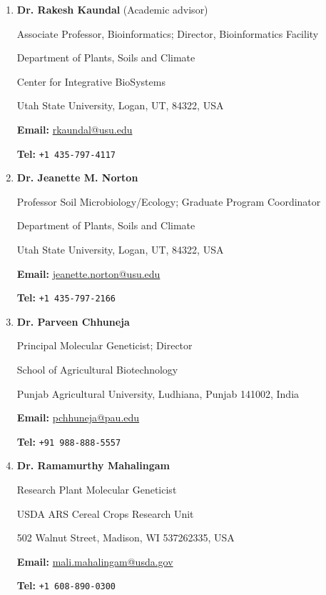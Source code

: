 
\setlength{\tabcolsep}{0.5em} %
\begin{enumerate}
\item \textbf{Dr.{} Rakesh Kaundal} (Academic advisor)\par
Associate Professor, Bioinformatics; Director, Bioinformatics Facility\par
Department of Plants, Soils and Climate\par
Center for Integrative BioSystems\par 
Utah State University, Logan, UT, 84322, USA\par

\textbf{Email:} \url{rkaundal@usu.edu}\par
\textbf{Tel:} {\texttt{+1 435-{}797-{}4117}}

\item \textbf{Dr.{} Jeanette M. Norton }\par 
Professor Soil Microbiology/Ecology; Graduate Program Coordinator\par
Department of Plants, Soils and Climate\par
Utah State University, Logan, UT, 84322, USA\par
\textbf{Email:} \url{jeanette.norton@usu.edu}\par
\textbf{Tel:} {\texttt{+1 435-{}797-{}2166}}

\item \textbf{Dr.{} Parveen Chhuneja  }\par 
Principal Molecular Geneticist; Director\par
School of Agricultural Biotechnology \par
Punjab Agricultural University, Ludhiana, Punjab 141002, India \par
\textbf{Email:} \url{pchhuneja@pau.edu}\par
\textbf{Tel:} {\texttt{+91 988-{}888-{}5557}}

\item \textbf{Dr.{} Ramamurthy Mahalingam  }\par 
Research Plant Molecular Geneticist\par
USDA ARS Cereal Crops Research Unit \par
502 Walnut Street, Madison, WI 537262335, USA\par
\textbf{Email:} \url{mali.mahalingam@usda.gov }\par
\textbf{Tel:} {\texttt{+1 608-{}890-{}0300}}




\end{enumerate}